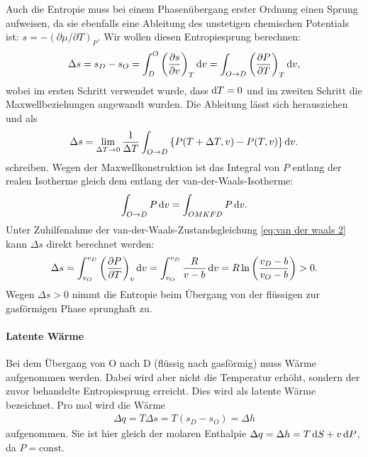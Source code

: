 Auch die Entropie muss bei einem Phasenübergang erster Ordnung einen Sprung aufweisen, da sie ebenfalls eine Ableitung des unstetigen chemischen Potentials ist: $s=-(\partial\mu/\partial T)_P$. Wir wollen diesen Entropiesprung berechnen:
\begin{align*}
    \Delta s = s_D-s_O = \int_D^O \left( \frac{\partial s}{\partial v} \right)_T\mathop{}\!\mathrm{d} v = \int_{O\rightarrow D} \left( \frac{\partial P}{\partial T} \right)_T\mathop{}\!\mathrm{d} v,
\end{align*}
wobei im ersten Schritt verwendet wurde, dass $\mathop{}\!\mathrm{d} T=0$ und im zweiten Schritt die Maxwellbeziehungen angewandt wurden. Die Ableitung lässt sich herausziehen und als 
\begin{align*}
    \Delta s = \lim_{\Delta T\rightarrow 0} \frac{1}{\Delta T} \int_{O\rightarrow D}\left\{ P(T+\Delta T,v) - P(T,v) \right\}\mathop{}\!\mathrm{d} v.
\end{align*}
schreiben. Wegen der Maxwellkonstruktion ist das Integral von $P$ entlang der realen Isotherme gleich dem entlang der van-der-Waals-Isotherme:
\begin{align*}
    \int_{O\rightarrow D} P\mathop{}\!\mathrm{d} v = \int_{OMKFD} P\mathop{}\!\mathrm{d} v.
\end{align*}
Unter Zuhilfenahme der van-der-Waals-Zustandsgleichung \eqref{eq:van der waals 2} kann $\Delta s$ direkt berechnet werden:
\begin{align}
    \Delta s = \int_{v_O}^{v_D} \left(\frac{\partial P }{\partial T}\right)_v\mathop{}\!\mathrm{d} v = \int_{v_O}^{v_D} \frac{R}{v-b}\mathop{}\!\mathrm{d} v = R \ln\left( \frac{v_D-b}{v_O-b} \right) > 0. 
\end{align}
Wegen $\Delta s>0$ nimmt die Entropie beim Übergang von der flüssigen zur gasförmigen Phase sprunghaft zu. 


\paragraph*{Latente Wärme}

Bei dem Übergang von O nach D (flüssig nach gasförmig) muss Wärme aufgenommen werden. Dabei wird aber nicht die Temperatur erhöht, sondern der zuvor behandelte Entropiesprung erreicht. Dies wird als latente Wärme bezeichnet. Pro \unit{\mole} wird die Wärme
\begin{align}
    \Delta q = T\Delta s = T(s_D-s_O) = \Delta h
\end{align}
aufgenommen. Sie ist hier gleich der molaren Enthalpie $\Delta q = \Delta h = T\mathop{}\!\mathrm{d} S+v\mathop{}\!\mathrm{d} P$, da $P=\mathrm{const}$. 

